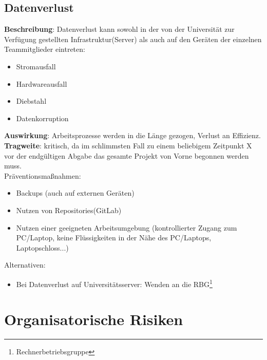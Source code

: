 \documentclass[a4paper, 12pt, titlepage]{scrartcl}
\begin{document}
	\subsection{Datenverlust}
		\textbf{Beschreibung}: Datenverlust kann sowohl in der von der Universit\"at zur Verf\"ugung gestellten Infrastruktur(Server) als auch auf den Ger\"aten der einzelnen Teammitglieder eintreten:
			\begin{itemize}
				\item Stromausfall
				\item Hardwareausfall
				\item Diebstahl
				\item Datenkorruption
			\end{itemize}
		\textbf{Auswirkung}: Arbeitsprozesse werden in die L\"ange gezogen, Verlust an Effizienz.\\
		\textbf{Tragweite}: kritisch, da im schlimmsten Fall zu einem beliebigem Zeitpunkt X vor der endg\"ultigen Abgabe das gesamte Projekt von Vorne begonnen werden muss.\\
		Pr\"aventionsma\ss nahmen:
			\begin{itemize}
				\item Backups (auch auf externen Ger\"aten)
				\item Nutzen von Repositories(GitLab)
				\item Nutzen einer geeigneten Arbeitsumgebung (kontrollierter Zugang zum PC/Laptop, keine Fl\"ussigkeiten in der N\"ahe des PC/Laptops, Laptopschloss...)
			\end{itemize}
		Alternativen: 
			\begin{itemize}
				\item Bei Datenverlust auf Universit\"atsserver: Wenden an die RBG\footnote{Rechnerbetriebsgruppe}
			\end{itemize}

\section{Organisatorische Risiken}
\end{document}
